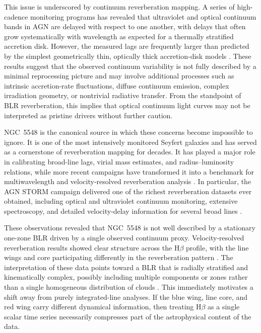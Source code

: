 \documentclass[12pt, a4paper]{article}
\begin{document}
This issue is underscored by continuum reverberation mapping. A series of high-cadence monitoring programs has revealed that ultraviolet and optical continuum bands in AGN are delayed with respect to one another, with delays that often grow systematically with wavelength as expected for a thermally stratified accretion disk. However, the measured lags are frequently larger than predicted by the simplest geometrically thin, optically thick accretion-disk models \cite{Fausnaugh2016,Fausnaugh2017,Edelson2019,Cackett2021}. These results suggest that the observed continuum variability is not fully described by a minimal reprocessing picture and may involve additional processes such as intrinsic accretion-rate fluctuations, diffuse continuum emission, complex irradiation geometry, or nontrivial radiative transfer. From the standpoint of BLR reverberation, this implies that optical continuum light curves may not be interpreted as pristine drivers without further caution.

NGC~5548 is the canonical source in which these concerns become impossible to ignore. It is one of the most intensively monitored Seyfert galaxies and has served as a cornerstone of reverberation mapping for decades. It has played a major role in calibrating broad-line lags, virial mass estimates, and radius--luminosity relations, while more recent campaigns have transformed it into a benchmark for multiwavelength and velocity-resolved reverberation analysis \cite{Peterson2002,BentzKatz2015,Cackett2021}. In particular, the AGN STORM campaign delivered one of the richest reverberation datasets ever obtained, including optical and ultraviolet continuum monitoring, extensive spectroscopy, and detailed velocity-delay information for several broad lines \cite{DeRosa2015,Pei2017,Horne2021}.

These observations revealed that NGC~5548 is not well described by a stationary one-zone BLR driven by a single observed continuum proxy. Velocity-resolved reverberation results showed clear structure across the H$\beta$ profile, with the line wings and core participating differently in the reverberation pattern \cite{Pei2017,Horne2021}. The interpretation of these data points toward a BLR that is radially stratified and kinematically complex, possibly including multiple components or zones rather than a single homogeneous distribution of clouds \cite{Horne2021,LongDexter2025}. This immediately motivates a shift away from purely integrated-line analyses. If the blue wing, line core, and red wing carry different dynamical information, then treating H$\beta$ as a single scalar time series necessarily compresses part of the astrophysical content of the data.
\end{document}
